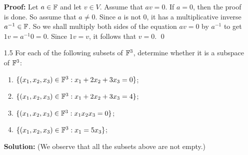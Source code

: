 \begin{enumerate}
      \textbf{Proof:} Let $a \in \mathbb{F}$ and let $v \in V$. Assume that $av = 0$. If
      $a = 0$, then the proof is done. So assume that $a \neq 0$. Since $a$ is
      not 0, it has a multiplicative inverse $a^{-1} \in \mathbb{F}$. So we shall
      multiply both sides of the equation $av = 0$ by $a^{-1}$ to get
      $1v = a^{-1}0 = 0$. Since $1v = v$, it follows that $v = 0$. \qed
   \item[1.5]  For each of the following subsets of $\mathbb{F}^3$, determine whether it
               is a subspace of $\mathbb{F}^3$:
               \begin{enumerate}
                  \item $\{(x_1, x_2, x_3) \in \mathbb{F}^3 : x_1 + 2x_2 + 3x_3 = 0\}$;
                  \item $\{(x_1, x_2, x_3) \in \mathbb{F}^3 : x_1 + 2x_2 + 3x_3 = 4\}$;
                  \item $\{(x_1, x_2, x_3) \in \mathbb{F}^3 : x_1x_2x_3 = 0\}$;
                  \item $\{(x_1, x_2, x_3) \in \mathbb{F}^3 : x_1 = 5x_3\}$;
               \end{enumerate}
      
      \textbf{Solution:} (We observe that all the subsets above are not empty.)


\end{enumerate}
